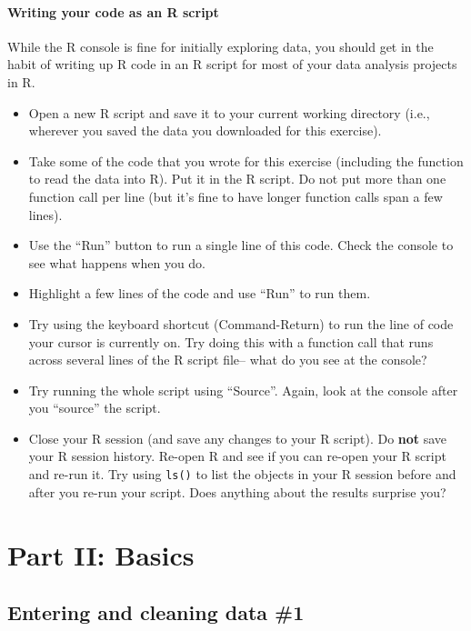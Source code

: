 \documentclass[]{book}
\providecommand{\tightlist}{%
  \setlength{\itemsep}{0pt}\setlength{\parskip}{0pt}}
\theoremstyle{definition}
\theoremstyle{definition}
\theoremstyle{definition}
\theoremstyle{remark}
\begin{document}
\subsection{Writing your code as an R
script}\label{writing-your-code-as-an-r-script}

While the R console is fine for initially exploring data, you should get
in the habit of writing up R code in an R script for most of your data
analysis projects in R.

\begin{itemize}
\tightlist
\item
  Open a new R script and save it to your current working directory
  (i.e., wherever you saved the data you downloaded for this exercise).
\item
  Take some of the code that you wrote for this exercise (including the
  function to read the data into R). Put it in the R script. Do not put
  more than one function call per line (but it's fine to have longer
  function calls span a few lines).
\item
  Use the ``Run'' button to run a single line of this code. Check the
  console to see what happens when you do.
\item
  Highlight a few lines of the code and use ``Run'' to run them.
\item
  Try using the keyboard shortcut (Command-Return) to run the line of
  code your cursor is currently on. Try doing this with a function call
  that runs across several lines of the R script file-- what do you see
  at the console?
\item
  Try running the whole script using ``Source''. Again, look at the
  console after you ``source'' the script.
\item
  Close your R session (and save any changes to your R script). Do
  \textbf{not} save your R session history. Re-open R and see if you can
  re-open your R script and re-run it. Try using \texttt{ls()} to list
  the objects in your R session before and after you re-run your script.
  Does anything about the results surprise you?
\end{itemize}

\part{Part II: Basics}\label{part-part-ii-basics}

\chapter{Entering and cleaning data
\#1}\label{entering-and-cleaning-data-1}
\end{document}
